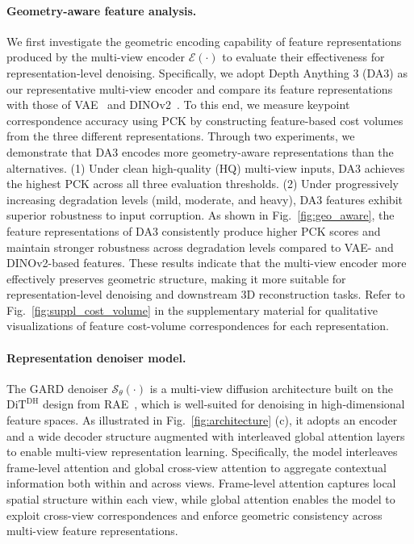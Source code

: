 \paragraph{Geometry-aware feature analysis.}
We first investigate the geometric encoding capability of feature representations produced by the multi-view encoder $\mathcal{E}(\cdot)$ to evaluate their effectiveness for representation-level denoising. Specifically, we adopt Depth Anything 3 (DA3) as our representative multi-view encoder and compare its feature representations with those of VAE~\cite{kingma2013auto} and DINOv2~\cite{oquab2023dinov2}. To this end, we measure keypoint correspondence accuracy using PCK by constructing feature-based cost volumes from the three different representations. Through two experiments, we demonstrate that DA3 encodes more geometry-aware representations than the alternatives. (1) Under clean high-quality (HQ) multi-view inputs, DA3 achieves the highest PCK across all three evaluation thresholds. (2) Under progressively increasing degradation levels (mild, moderate, and heavy), DA3 features exhibit superior robustness to input corruption. As shown in Fig.~\ref{fig:geo_aware}, the feature representations of DA3 consistently produce higher PCK scores and maintain stronger robustness across degradation levels compared to VAE- and DINOv2-based features. These results indicate that the multi-view encoder more effectively preserves geometric structure, making it more suitable for representation-level denoising and downstream 3D reconstruction tasks. Refer to Fig.~\ref{fig:suppl_cost_volume} in the supplementary material for qualitative visualizations of feature cost-volume correspondences for each representation.




\paragraph{Representation denoiser model.}
The GARD denoiser $\mathcal{S}_{\theta}(\cdot)$ is a multi-view diffusion architecture built on the $\text{DiT}^{\text{DH}}$ design from RAE~\cite{zheng2025diffusion}, which is well-suited for denoising in high-dimensional feature spaces. As illustrated in Fig.~\ref{fig:architecture} (c), it adopts an encoder and a wide decoder structure augmented with interleaved global attention layers to enable multi-view representation learning. Specifically, the model interleaves frame-level attention and global cross-view attention to aggregate contextual information both within and across views. Frame-level attention captures local spatial structure within each view, while global attention enables the model to exploit cross-view correspondences and enforce geometric consistency across multi-view feature representations.



